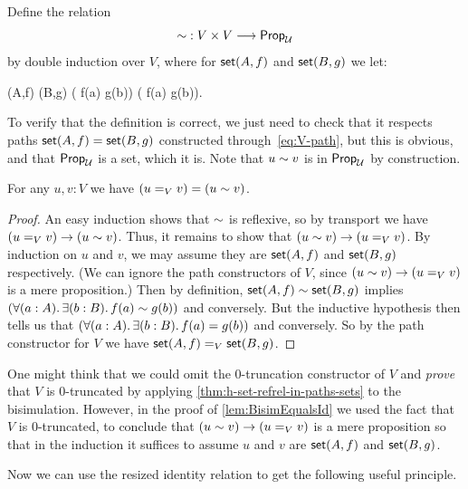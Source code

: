 \begin{defn}\label{def:bisimulation}
  Define the 
  relation
  \begin{equation*}
    \mathord{\sim} : V \times V \longrightarrow \mathsf{Prop}_{\mathcal{U}}
  \end{equation*}
  by double induction over $V$, where for $\mathsf{set}(A,f)$ and $\mathsf{set}(B,g)$ we let:
  \begin{narrowmultline*}
    \vset(A,f)  \bisim \vset(B,g)  \narrowbreak
    \big( f(a)  \bisim g(b)\big) \land
    \big( f(a) \bisim g(b)\big).
  \end{narrowmultline*}
\end{defn}
%
To verify that the definition is correct, we just need to check that it respects paths $\mathsf{set}(A, f) = \mathsf{set}(B, g)$ constructed through~\eqref{eq:V-path}, but this is obvious, and that $\mathsf{Prop}_{\mathcal{U}}$ is a set, which it is.  Note that $u \sim v$ is in $\mathsf{Prop}_\mathcal{U}$ by construction.

\begin{lem}\label{lem:BisimEqualsId}
For any $u,v:V$ we have $(u=_V v) = (u \sim v)$.
\end{lem}

\begin{proof}
An easy induction shows that $\sim$ is reflexive, so by transport we have $(u=_V v)\to (u \sim v)$.
Thus, it remains to show that $(u \sim v)\to (u=_V v)$.
By induction on $u$ and $v$, we may assume they are $\mathsf{set}(A,f)$ and $\mathsf{set}(B,g)$ respectively.
(We can ignore the path constructors of $V$, since $(u \sim v)\to (u=_V v)$ is a mere proposition.)
Then by definition, $\mathsf{set}(A,f)\sim\mathsf{set}(B,g)$ implies $(\fall{a:A}\exis{b:B}f(a)  \bisim g(b))$ and conversely.
But the inductive hypothesis then tells us that $(\fall{a:A}\exis{b:B}f(a) = g(b))$ and conversely.
So by the path con\-struc\-tor for $V$ we have $\mathsf{set}(A,f) =_V \mathsf{set}(B,g)$.
\end{proof}

One might think that we could omit the 0-truncation constructor of $V$ and \emph{prove} that $V$ is 0-truncated by applying \cref{thm:h-set-refrel-in-paths-sets} to the bisimulation.
However, in the proof of \cref{lem:BisimEqualsId} we used the fact that $V$ is 0-truncated, to conclude that $(u \sim v)\to (u=_V v)$ is a mere proposition so that in the induction it suffices to assume $u$ and $v$ are $\mathsf{set}(A,f)$ and $\mathsf{set}(B,g)$.

Now we can use the resized identity relation to get the following useful principle.

